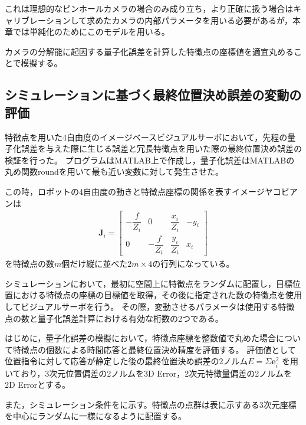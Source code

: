 \documentclass[fleqn]{jreport}
\begin{document}
これは理想的なピンホールカメラの場合のみ成り立ち，より正確に扱う場合はキャリブレーションして求めたカメラの内部パラメータを用いる必要があるが，本章では単純化のためにこのモデルを用いる。


カメラの分解能に起因する量子化誤差を計算した特徴点の座標値を適宜丸めることで模擬する。





\subsection{シミュレーションに基づく最終位置決め誤差の変動の評価}
特徴点を用いた4自由度のイメージベースビジュアルサーボにおいて，先程の量子化誤差を与えた際に生じる誤差と冗長特徴点を用いた際の最終位置決め誤差の検証を行った。
プログラムはMATLAB上で作成し，量子化誤差はMATLABの丸め関数roundを用いて最も近い変数に対して発生させた。

この時，ロボットの4自由度の動きと特徴点座標の関係を表すイメージヤコビアンは
\begin{eqnarray}
	\bm{J}_{i}=
	\left[
	\begin{array}{cccc}
		-\dfrac{f}{Z_i} & 0 & \dfrac{x_i}{Z_i} & -y_i\\[1.5ex]
		0 & -\dfrac{f}{Z_i}  & \dfrac{y_i}{Z_i} & x_i
	\end{array}
	\right]
	\label{eq:jacobian2}
\end{eqnarray}	
を特徴点の数$m$個だけ縦に並べた$2m \times 4$の行列になっている。


シミュレーションにおいて，最初に空間上に特徴点をランダムに配置し，目標位置における特徴点の座標の目標値を取得，その後に指定された数の特徴点を使用してビジュアルサーボを行う。
その際，変動させるパラメータは使用する特徴点の数と量子化誤差計算における有効な桁数の2つである。


はじめに，量子化誤差の模擬において，特徴点座標を整数値で丸めた場合について特徴点の個数による時間応答と最終位置決め精度を評価する。
評価値として位置指令に対して応答が静定した後の最終位置決め誤差の2ノルム$E =\Sigma \bm{e}_i^2 $ を用いており，3次元位置偏差の2ノルムを3D Error，2次元特徴量偏差の2ノルムを2D Errorとする。

また，シミュレーション条件をに示す。特徴点の点群は表に示すある3次元座標を中心にランダムに一様になるように配置する。
\end{document}
